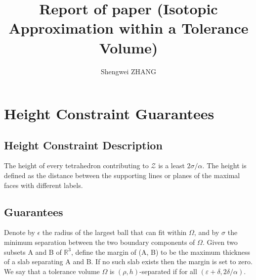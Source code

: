 \documentclass{article}
\title{Report of paper (Isotopic Approximation within a Tolerance Volume)}
\author{Shengwei ZHANG\\
}
\theoremstyle{definition}
\theoremstyle{remark}
\begin{document}
\maketitle

\section{Height Constraint Guarantees}
\subsection{Height Constraint Description}
The height of every tetrahedron contributing to $\mathcal{Z}$ is a least $2\sigma / \alpha$. The height is defined as the distance between the supporting lines or planes of the maximal faces with different labels.

\subsection{Guarantees}
Denote by $\epsilon$ the radius of the largest ball that can fit within $\Omega$, and by $\sigma$ the minimum separation between the two boundary components of $\Omega$.
Given two subsets A and B of $\mathbb{R}^3$, define the margin of (A, B) to be the maximum thickness of a slab separating A and B. If no such slab exists then the margin is set to zero. We say that a tolerance volume $\Omega$ is $(\rho, h)$-separated if for all $(\varepsilon+\delta, 2\delta/\alpha)$.
\end{document}

